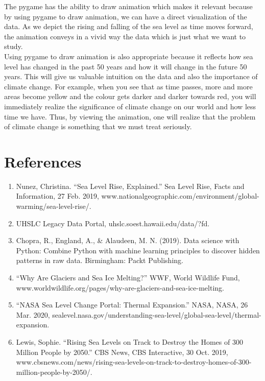 \documentclass[fontsize=11pt]{article}
\begin{document}
The pygame has the ability to draw animation which makes it relevant because by using pygame to draw animation, we can have a direct visualization of the data. As we depict the rising and falling of the sea level as time moves forward, the animation conveys in a vivid way the data which is just what we want to study. \\
Using pygame to draw animation is also appropriate because it reflects how sea level has changed in the past 50 years and how it will change in the future 50 years. This will give us valuable intuition on the data and also the importance of climate change. For example, when you see that as time passes, more and more areas become yellow and the colour gets darker and darker towards red, you will immediately realize the significance of climate change on our world and how less time we have. Thus, by viewing the animation, one will realize that the problem of climate change is something that we must treat seriously.
  

\section*{References}
\begin{enumerate}
    \item
    Nunez, Christina. “Sea Level Rise, Explained.” Sea Level Rise, Facts and Information, 27 Feb. 2019, www.nationalgeographic.com/environment/global-warming/sea-level-rise/. 
    \item
    UHSLC Legacy Data Portal, uhslc.soest.hawaii.edu/data/?fd. 
    \item
    Chopra, R., England, A., \& Alaudeen, M. N. (2019). Data science with Python: Combine Python with machine learning principles to discover hidden patterns in raw data. Birmingham: Packt Publishing.
    \item
    “Why Are Glaciers and Sea Ice Melting?” WWF, World Wildlife Fund, www.worldwildlife.org/pages/why-are-glaciers-and-sea-ice-melting. 
    \item
    “NASA Sea Level Change Portal: Thermal Expansion.” NASA, NASA, 26 Mar. 2020, sealevel.nasa.gov/understanding-sea-level/global-sea-level/thermal-expansion. 
    \item
    Lewis, Sophie. “Rising Sea Levels on Track to Destroy the Homes of 300 Million People by 2050.” CBS News, CBS Interactive, 30 Oct. 2019, www.cbsnews.com/news/rising-sea-levels-on-track-to-destroy-homes-of-300-million-people-by-2050/. 
\end{enumerate}

\end{document}

